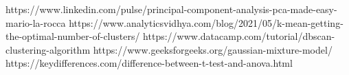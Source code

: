 \documentclass{article}
\begin{document}
\begin{thebibliography}{2}
https://www.linkedin.com/pulse/principal-component-analysis-pca-made-easy-mario-la-rocca
https://www.analyticsvidhya.com/blog/2021/05/k-mean-getting-the-optimal-number-of-clusters/
https://www.datacamp.com/tutorial/dbscan-clustering-algorithm
https://www.geeksforgeeks.org/gaussian-mixture-model/
https://keydifferences.com/difference-between-t-test-and-anova.html
\end{thebibliography}
\end{document}
